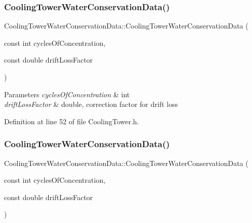 \subsubsection{\texorpdfstring{Cooling\+Tower\+Water\+Conservation\+Data()}{CoolingTowerWaterConservationData()}\hspace{0.1cm}{\footnotesize\ttfamily [2/3]}}
{\footnotesize\ttfamily Cooling\+Tower\+Water\+Conservation\+Data\+::\+Cooling\+Tower\+Water\+Conservation\+Data (\begin{DoxyParamCaption}\item[{const int}]{cycles\+Of\+Concentration,  }\item[{const double}]{drift\+Loss\+Factor }\end{DoxyParamCaption})\hspace{0.3cm}{\ttfamily [inline]}}


\begin{DoxyParams}{Parameters}
{\em cycles\+Of\+Concentration} & int \\
\hline
{\em drift\+Loss\+Factor} & double, correction factor for drift loss \\
\hline
\end{DoxyParams}


Definition at line 52 of file Cooling\+Tower.\+h.

\mbox{\label{class_cooling_tower_water_conservation_data_a14cdf792dfd962c99a5ad59800d28ff6}} 
\subsubsection{\texorpdfstring{Cooling\+Tower\+Water\+Conservation\+Data()}{CoolingTowerWaterConservationData()}\hspace{0.1cm}{\footnotesize\ttfamily [3/3]}}
{\footnotesize\ttfamily Cooling\+Tower\+Water\+Conservation\+Data\+::\+Cooling\+Tower\+Water\+Conservation\+Data (\begin{DoxyParamCaption}\item[{const int}]{cycles\+Of\+Concentration,  }\item[{const double}]{drift\+Loss\+Factor }\end{DoxyParamCaption})\hspace{0.3cm}{\ttfamily [inline]}}


